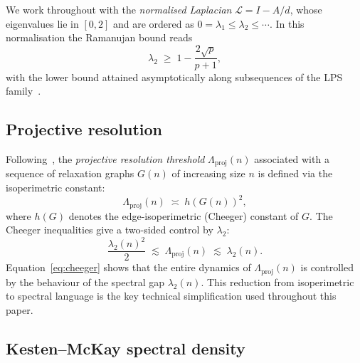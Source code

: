 \documentclass[11pt]{article}
\newcommand{\Lproj}{\Lambda_{\mathrm{proj}}}
\begin{document}
      We work throughout with the \emph{normalised Laplacian}
      $\mathcal{L} = I - A/d$, whose eigenvalues lie in $[0,2]$ and are ordered as
      $0 = \lambda_1 \leq \lambda_2 \leq \cdots$.
      In this normalisation the Ramanujan bound reads
      \begin{equation}
        \lambda_2 \;\geq\; 1 - \frac{2\sqrt{p}}{p+1},
        \label{eq:ramanujan_lower}
      \end{equation}
      with the lower bound attained asymptotically along subsequences of the LPS
      family~\cite{LPS}.

    \subsection{Projective resolution}
      \label{subsec:lambda_proj}

      Following~\cite{Beau2026a5}, the \emph{projective resolution threshold}
      $\Lproj(n)$ associated with a sequence of relaxation graphs $G(n)$ of
      increasing size $n$ is defined via the isoperimetric constant:
      \begin{equation}
        \Lproj(n) \;\asymp\; h(G(n))^2,
        \label{eq:lambda_proj_def}
      \end{equation}
      where $h(G)$ denotes the edge-isoperimetric (Cheeger) constant of $G$.
      The Cheeger inequalities give a two-sided control by $\lambda_2$:
      \begin{equation}
        \frac{\lambda_2(n)^2}{2} \;\lesssim\; \Lproj(n) \;\lesssim\; \lambda_2(n).
        \label{eq:cheeger}
      \end{equation}
      Equation~\eqref{eq:cheeger} shows that the entire dynamics of $\Lproj(n)$
      is controlled by the behaviour of the spectral gap $\lambda_2(n)$.
      This reduction from isoperimetric to spectral language is the key technical
      simplification used throughout this paper.

    \subsection{Kesten--McKay spectral density}
      \label{subsec:km}
\end{document}
